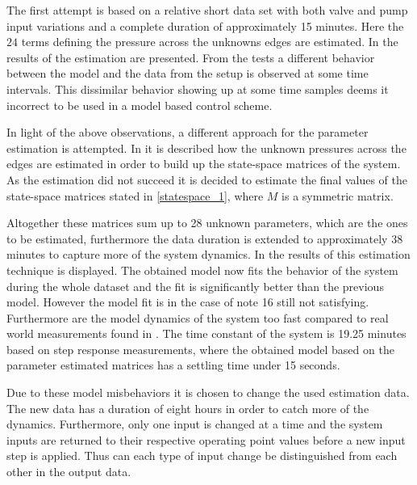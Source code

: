 The first attempt is based on a relative short data set with both valve and pump input variations and a complete duration of approximately 15 minutes. Here the $24$ terms defining the pressure across the unknowns edges are estimated. In  the results of the estimation are presented.
From the tests a different behavior between the model and the data from the setup is observed at some time intervals. This dissimilar behavior showing up at some time samples deems it incorrect to be used in a model based control scheme. 

In light of the above observations, a different approach for the parameter estimation is attempted. In  it is described how the unknown pressures across the edges are estimated in order to build up the state-space matrices of the system. As the estimation did not succeed it is decided to estimate the final values of the state-space matrices stated in \eqref{statespace_1}, where $M$ is a symmetric matrix.

Altogether these matrices sum up to 28 unknown parameters, which are the ones to be estimated, furthermore the data duration is extended to approximately 38 minutes to capture more of the system dynamics. In  the results of this estimation technique is displayed. 
The obtained model now fits the behavior of the system during the whole dataset and the fit is significantly better than the previous model. However the model fit is in the case of note 16 still not satisfying. 
Furthermore are the model dynamics of the system too fast compared to real world measurements found in . The time constant of the system is 19.25 minutes based on step response measurements, where the obtained model based on the parameter estimated matrices has a settling time under 15 seconds.

Due to these model misbehaviors it is chosen to change the used estimation data. The new data has a duration of eight hours in order to catch more of the dynamics. Furthermore, only one input is changed at a time and the system inputs are returned to their respective operating point values before a new input step is applied. Thus can each type of input change be distinguished from each other in the output data. 


